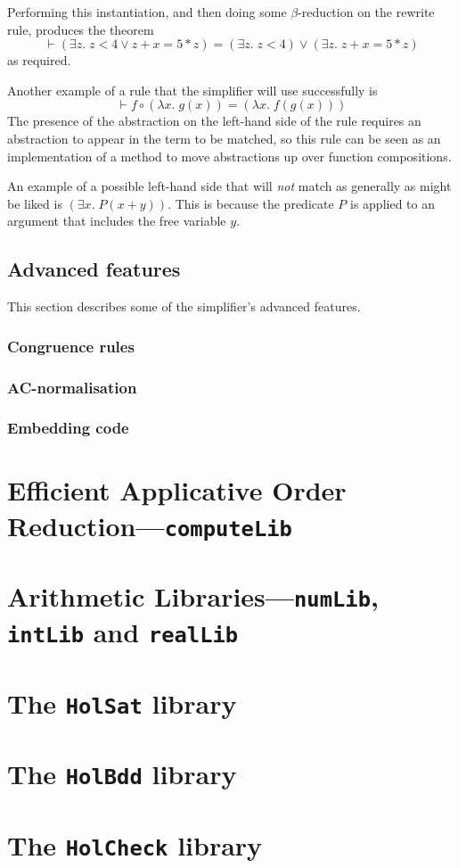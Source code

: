 Performing this instantiation, and then doing some $\beta$-reduction
on the rewrite rule, produces the theorem\[
\vdash (\exists z. \;z < 4 \lor z + x = 5 * z) =
(\exists z. \;z < 4) \lor (\exists z.\;z + x = 5 * z)
\]
as required.

Another example of a rule that the simplifier will use successfully is
\[
\vdash f \circ (\lambda x.\; g(x)) = (\lambda x.\;f(g(x)))
\]
The presence of the abstraction on the left-hand side of the rule
requires an abstraction to appear in the term to be matched, so this
rule can be seen as an implementation of a method to move abstractions
up over function compositions.

An example of a possible left-hand side that will \emph{not} match as
generally as might be liked is $(\exists x.\;P(x + y))$.  This is
because the predicate $P$ is applied to an argument that includes the
free variable $y$.

\subsection{Advanced features}
\label{sec:advanced-simplifier}

This section describes some of the simplifier's advanced features.

\subsubsection{Congruence rules}
\label{sec:simp-congruences}

\subsubsection{AC-normalisation}

\subsubsection{Embedding code}


\section{Efficient Applicative Order Reduction---\texttt{computeLib}}
\label{sec:computeLib}

\section{Arithmetic Libraries---\texttt{numLib}, \texttt{intLib} and \texttt{realLib}}
\label{sec:numLib}

\section{The \texttt{HolSat} library}\label{sec:HolSatLib}
\section{The \texttt{HolBdd} library}\label{sec:HolBddLib}
\section{The \texttt{HolCheck} library}\label{sec:HolCheckLib}


